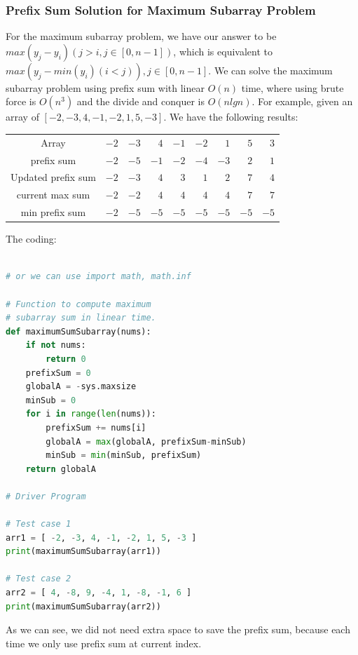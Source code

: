 \documentclass[../specific-algorithms.tex]{subfiles}
\begin{document}
\subsubsection{Prefix Sum Solution for Maximum Subarray Problem}
For the maximum subarray problem, we have our answer to be $max(y_j - y_i) (j>i, j\in[0,n-1])$, which is equivalent to $max(y_j - min(y_i)(i<j)), j\in[0,n-1]$. We can solve the maximum subarray problem using prefix sum with linear $O(n)$ time, where using brute force is $O(n^3)$ and the divide and conquer is $O(nlgn)$. For example, given an array of $[-2, -3, 4, -1, -2, 1, 5, -3]$. We have the following results:
\begin{table}[!ht]
\centering
\noindent{}
\label{tab: prefix_sum}
 \noindent \begin{tabular}{c rrrrrrrr}
  \hline\hline
Array  & $-2$& $-3$ & $4$& $-1$& $-2$& $1$& $5$& $3$\\
prefix sum   & $-2$& $-5$ & $-1$& $-2$& $-4$& $-3$& $2$& $1$ \\
Updated prefix sum &$-2$& $-3$& $4$& $3$& $1$& $2$ &$7$&$ 4$ \\
current max sum & $-2$& $-2$ & $4$& $4$& $4$& $4$& $7$& $7$\\ 
min prefix sum & $-2$& $-5$ & $-5$& $-5$& $-5$& $-5$& $-5$& $-5$\\ \hline
\end{tabular}
\end{table}
The coding:
\begin{lstlisting}[language = Python]

# or we can use import math, math.inf

# Function to compute maximum 
# subarray sum in linear time. 
def maximumSumSubarray(nums): 
    if not nums:
        return 0
    prefixSum = 0
    globalA = -sys.maxsize
    minSub = 0
    for i in range(len(nums)):
        prefixSum += nums[i]
        globalA = max(globalA, prefixSum-minSub)
        minSub = min(minSub, prefixSum)
    return globalA

# Driver Program 

# Test case 1 
arr1 = [ -2, -3, 4, -1, -2, 1, 5, -3 ] 
print(maximumSumSubarray(arr1)) 

# Test case 2 
arr2 = [ 4, -8, 9, -4, 1, -8, -1, 6 ] 
print(maximumSumSubarray(arr2)) 
\end{lstlisting}
As we can see, we did not need extra space to save the prefix sum, because each time we only use prefix sum at current index. 
\end{document}
